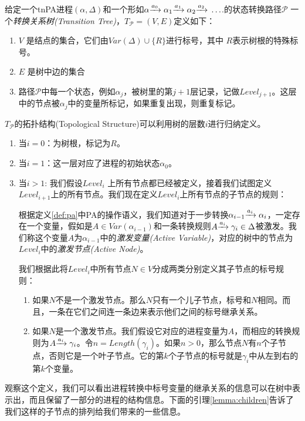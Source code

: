 \begin{defn}[转换关系树]\label{def:trans-tree}

给定一个tnPA进程$(\alpha,\Delta)$和一个形如$\alpha{\xrightarrow{a_0}{}}\alpha_1{\xrightarrow{a_1}{}}\alpha_2{\xrightarrow{a_2}{}}\ldots$.的状态转换路径$\mathcal{P}$
一个\emph{转换关系树(Transition Tree)}，$T_{\mathcal{P}}=(V,E)$定义如下：
\begin{enumerate}
\item $V$ 是结点的集合，它们由$Var(\Delta)\cup \{R\}$进行标号，其中 $R$表示树根的特殊标号。
\item $E$ 是树中边的集合
\item 路径$\mathcal{P}$中每一个状态，例如$\alpha_j$，被树里的第$j+1$层记录，记做$Level_{j+1}$。这层中的节点被$\alpha_j$中的变量所标记，如果重复出现，则重复标记。
\end{enumerate}

$T_{\mathcal{P}}$的拓扑结构(Topological Structure)可以利用树的层数$i$进行归纳定义。
\begin{enumerate}
\item 当$i=0$：为树根，标记为$R$。
\item 当$i=1$：这一层对应了进程的初始状态$\alpha_0$。
\item 当$i>1$: 我们假设$Level_i$ 上所有节点都已经被定义，接着我们试图定义$Level_{i+1}$上的所有节点。我们现在定义$Level_i$上所有节点的子节点的规则：

根据定义\ref{def:pa}中PA的操作语义，我们知道对于一步转换$\alpha_{i-1}{\xrightarrow{a_i}{}}\alpha_{i}$，一定存在一个变量，假如是$A\in Var(\alpha_{i-1})$和一条转换规则$A{\xrightarrow{a_i}{}}\gamma_i\in\Delta$被激发。我们称这个变量$A$为$\alpha_{i-1}$中的\emph{激发变量(Active Variable)}，对应的树中的节点为$Level_i$中的\emph{激发节点(Active Node)}。

我们根据此将$Level_i$中所有节点$N\in V$分成两类分别定义其子节点的标号规则：
\begin{enumerate}
\item 如果$N$不是一个激发节点。那么$N$只有一个儿子节点，标号和$N$相同。而且，一条在它们之间连一条边来表示他们之间的标号继承关系。
\item 如果$N$是一个激发节点。我们假设它对应的进程变量为$A$，而相应的转换规则为$A{\xrightarrow{a_i}{}}\gamma_i$。令$n=Length(\gamma_i)$。如果$n>0$，那么节点$N$有$n$个子节点，否则它是一个叶子节点。它的第$k$个子节点的标号就是$\gamma_i$中从左到右的第$k$个变量。
\end{enumerate}
\end{enumerate}
\end{defn}

观察这个定义，我们可以看出进程转换中标号变量的继承关系的信息可以在树中表示出，而且保留了一部分的进程的结构信息。下面的引理\ref{lemma:children}告诉了我们这样的子节点的排列给我们带来的一些信息。

